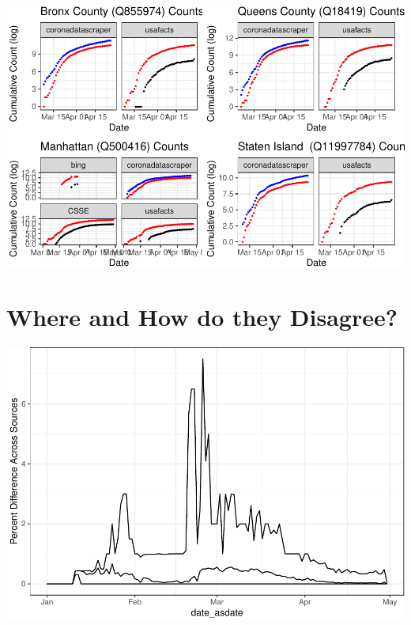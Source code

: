 \documentclass[
]{book}
\begin{document}
\begin{center}\includegraphics[width=1\linewidth]{HowToBeCarefulWithCovid19Counts_files/figure-latex/unnamed-chunk-29-1} \end{center}

\hypertarget{where-and-how-do-they-disagree}{%
\section{Where and How do they Disagree?}\label{where-and-how-do-they-disagree}}

\begin{center}\includegraphics[width=1\linewidth]{HowToBeCarefulWithCovid19Counts_files/figure-latex/unnamed-chunk-31-1} \end{center}

\hypertarget{htmlwidget-c98470a77511f1619de2}{}
\end{document}
